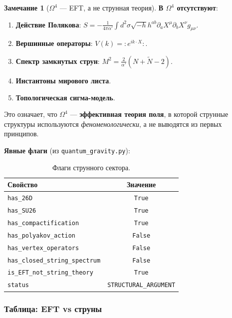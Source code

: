 \documentclass[11pt,a4paper]{article}
\newcommand{\Om}{\ensuremath{\Omega^4}}
\theoremstyle{definition}
\newtheorem{remark}[theorem]{Замечание}
\begin{document}
\begin{remark}[$\Om$ --- EFT, а не струнная теория]
\label{rem:string-eft}
\textbf{В $\Om$ отсутствуют}:
\begin{enumerate}
    \item \textbf{Действие Полякова}:
          $S = -\frac{1}{4\pi\alpha'} \int d^2\sigma \sqrt{-h}
          h^{ab} \partial_a X^\mu \partial_b X^\nu g_{\mu\nu}$.
    \item \textbf{Вершинные операторы}:
          $V(k) = {:}e^{ik \cdot X}{:}$.
    \item \textbf{Спектр замкнутых струн}:
          $M^2 = \frac{2}{\alpha'}(N + \tilde{N} - 2)$.
    \item \textbf{Инстантоны мирового листа}.
    \item \textbf{Топологическая сигма-модель}.
\end{enumerate}

\medskip\noindent
Это означает, что $\Om$ --- \textbf{эффективная теория поля},
в которой струнные структуры используются \emph{феноменологически},
а не выводятся из первых принципов.

\medskip\noindent
\textbf{Явные флаги} (из \texttt{quantum\_gravity.py}):

\begin{table}[ht]
\centering
\caption{Флаги струнного сектора.}
\label{tab:string-sector-flags}
\begin{tabular}{lc}
\toprule
Свойство & Значение \\
\midrule
\texttt{has\_26D} & \texttt{True} \\
\texttt{has\_SU26} & \texttt{True} \\
\texttt{has\_compactification} & \texttt{True} \\
\midrule
\texttt{has\_polyakov\_action} & \texttt{False} \\
\texttt{has\_vertex\_operators} & \texttt{False} \\
\texttt{has\_closed\_string\_spectrum} & \texttt{False} \\
\midrule
\texttt{is\_EFT\_not\_string\_theory} & \texttt{True} \\
\texttt{status} & \texttt{STRUCTURAL\_ARGUMENT} \\
\bottomrule
\end{tabular}
\end{table}
\end{remark}

\subsubsection{Таблица: EFT vs струны}
\end{document}
